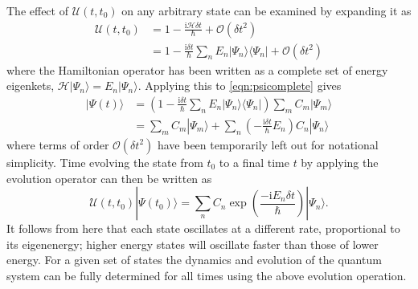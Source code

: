 The effect of $\mathscr{U}(t,t_0)$ on any arbitrary state can be examined by expanding it as
\begin{align}
    \mathscr{U}(t,t_0) &= 1 - \frac{\textrm{i}\mathcal{H}\delta t}{\hbar} + \mathcal{O}(\delta t^2) \\
        &= 1 - \frac{\textrm{i}\delta t}{\hbar}{\displaystyle\sum\limits_{n} E_n |\Psi_n\rangle \langle \Psi_n |} + \mathcal{O}(\delta t^2)
\end{align}
where the Hamiltonian operator has been written as a complete set of energy eigenkets, $\mathcal{H}|\Psi_n\rangle = E_n|\Psi_n\rangle$. Applying this to \eqref{eqn:psicomplete} gives
\begin{align}
    |\Psi (t) \rangle &= \left( 1 - \frac{\textrm{i}\delta t}{\hbar}\displaystyle\sum\limits_{n}E_n|\Psi_n\rangle\langle \Psi_n |  \right)\displaystyle\sum\limits_{m} C_m |\Psi_m \rangle \\
        &= \displaystyle\sum\limits_{m} C_m |\Psi_m \rangle + \displaystyle\sum\limits_{n}\left( - \frac{\textrm{i}\delta t}{\hbar}E_n \right) C_n|\Psi_n\rangle
\end{align}
where terms of order $\mathcal{O}(\delta t^2)$ have been temporarily left out for notational simplicity. Time evolving the state from $t_0$ to a final time $t$ by applying the evolution operator can then be written as
\begin{equation}
   \mathscr{U}(t,t_0)|\Psi(t_0) \rangle = \displaystyle\sum\limits_{n} C_n \exp\left(\frac{-\textrm{i}{E_n}\delta t}{\hbar}\right)|\Psi_n \rangle.
\end{equation}
It follows from here that each state oscillates at a different rate, proportional to its eigenenergy; higher energy states will oscillate faster than those of lower energy. For a given set of states the dynamics and evolution of the quantum system can be fully determined for all times using the above evolution operation.

